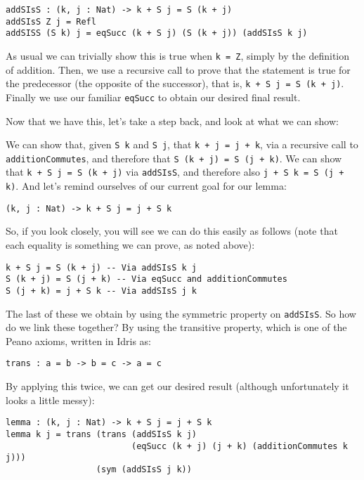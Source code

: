 \documentclass{article}
\newcommand{\inline}[1]{\texttt{#1}}
\begin{document}
\begin{verbatim}
addSIsS : (k, j : Nat) -> k + S j = S (k + j)
addSIsS Z j = Refl
addSISS (S k) j = eqSucc (k + S j) (S (k + j)) (addSIsS k j)
\end{verbatim}

As usual we can trivially show this is true when \inline{k = Z}, simply by the definition of addition.
Then, we use a recursive call to prove that the statement is true for the predecessor (the opposite of the successor), that is, \inline{k + S j = S (k + j)}.
Finally we use our familiar \inline{eqSucc} to obtain our desired final result.

Now that we have this, let’s take a step back, and look at what we can show:

We can show that, given \inline{S k} and \inline{S j}, that \inline{k + j = j + k}, via a recursive call to \inline{additionCommutes}, and therefore that \inline{S (k + j) = S (j + k)}.
We can show that \inline{k + S j = S (k + j)} via \inline{addSIsS}, and therefore also \inline{j + S k = S (j + k)}.
And let’s remind ourselves of our current goal for our lemma:

\begin{verbatim}
(k, j : Nat) -> k + S j = j + S k
\end{verbatim}

So, if you look closely, you will see we can do this easily as follows (note that each equality is something we can prove, as noted above):

\begin{verbatim}
k + S j = S (k + j) -- Via addSIsS k j
S (k + j) = S (j + k) -- Via eqSucc and additionCommutes
S (j + k) = j + S k -- Via addSIsS j k
\end{verbatim}

The last of these we obtain by using the symmetric property on \inline{addSIsS}.
So how do we link these together?
By using the transitive property, which is one of the Peano axioms, written in Idris as:

\begin{verbatim}
trans : a = b -> b = c -> a = c
\end{verbatim}

By applying this twice, we can get our desired result (although unfortunately it looks a little messy):

\begin{verbatim}
lemma : (k, j : Nat) -> k + S j = j + S k
lemma k j = trans (trans (addSIsS k j)
                         (eqSucc (k + j) (j + k) (additionCommutes k j)))
                  (sym (addSIsS j k))
\end{verbatim}
\end{document}
